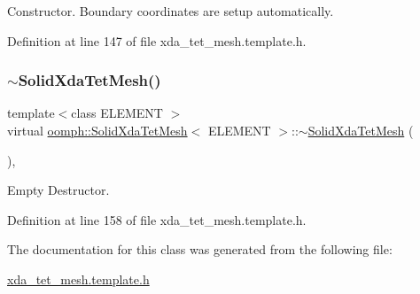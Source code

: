 Constructor. Boundary coordinates are setup automatically. 



Definition at line 147 of file xda\+\_\+tet\+\_\+mesh.\+template.\+h.

\mbox{\label{classoomph_1_1SolidXdaTetMesh_a9425d53bae183deb23fb3a1019a48ca8}} 
\subsubsection{\texorpdfstring{$\sim$\+Solid\+Xda\+Tet\+Mesh()}{~SolidXdaTetMesh()}}
{\footnotesize\ttfamily template$<$class E\+L\+E\+M\+E\+NT $>$ \\
virtual \hyperlink{classoomph_1_1SolidXdaTetMesh}{oomph\+::\+Solid\+Xda\+Tet\+Mesh}$<$ E\+L\+E\+M\+E\+NT $>$\+::$\sim$\hyperlink{classoomph_1_1SolidXdaTetMesh}{Solid\+Xda\+Tet\+Mesh} (\begin{DoxyParamCaption}{ }\end{DoxyParamCaption})\hspace{0.3cm}{\ttfamily [inline]}, {\ttfamily [virtual]}}



Empty Destructor. 



Definition at line 158 of file xda\+\_\+tet\+\_\+mesh.\+template.\+h.



The documentation for this class was generated from the following file\+:\begin{DoxyCompactItemize}
\item 
\hyperlink{xda__tet__mesh_8template_8h}{xda\+\_\+tet\+\_\+mesh.\+template.\+h}\end{DoxyCompactItemize}
